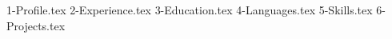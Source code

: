 \documentclass[margin]{res}
\begin{document}
    \address{\\ Email \qquad : louiszhenyean@gmail.com \vspace{0.1cm}
             \\ LinkedIn \ \ : \url{linkedin.com/in/louiszhenyean} \\ \\}
    \address{
    \\ Whatsapp/Telegram : (+60) 19-567 5808 \\ \\}
    
    \begin{resume}\vspace{0.2cm}
        {1-Profile.tex} 
        {2-Experience.tex}
        {3-Education.tex} 
        {4-Languages.tex} \clearpage
        {5-Skills.tex} 
        {6-Projects.tex} 
    \end{resume}
\(\)
\end{document}
